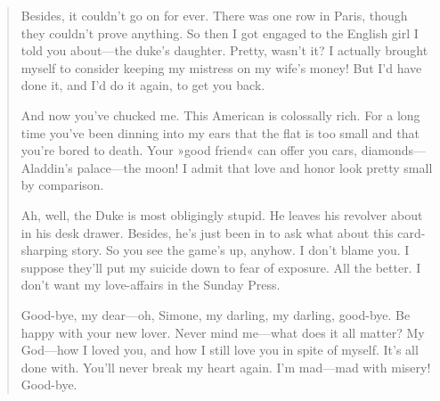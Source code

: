 \begin{quotation}
Besides, it couldn't go on for ever. There was one row in Paris,
though they couldn't prove anything. So then I got engaged to the
English girl I told you about\allowbreak---\allowbreak the duke's daughter. Pretty, wasn't it?
I actually brought myself to consider keeping my mistress on my wife's
money! But I'd have done it, and I'd do it again, to get you back.

And now you've chucked me. This American is colossally rich. For a
long time you've been dinning into my ears that the flat is too small
and that you're bored to death. Your »good friend« can offer you cars,
diamonds\allowbreak---\allowbreak Aladdin's palace\allowbreak---\allowbreak the moon! I admit that love and honor look
pretty small by comparison.

Ah, well, the Duke is most obligingly stupid. He leaves his revolver
about in his desk drawer. Besides, he's just been in to ask what about
this card-sharping story. So you see the game's up, anyhow. I don't
blame you. I suppose they'll put my suicide down to fear of exposure.
All the better. I don't want my love-affairs in the Sunday Press.

Good-bye, my dear\allowbreak---\allowbreak oh, Simone, my darling, my darling, good-bye. Be
happy with your new lover. Never mind me\allowbreak---\allowbreak what does it all matter? My
God\allowbreak---\allowbreak how I loved you, and how I still love you in spite of myself.
It's all done with. You'll never break my heart again. I'm mad\allowbreak---\allowbreak mad
with misery! Good-bye.

\end{quotation}